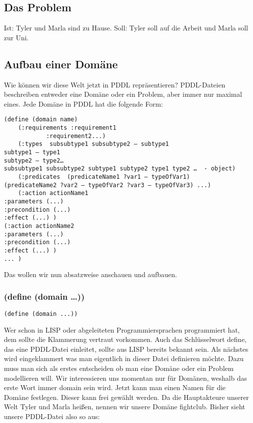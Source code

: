 \documentclass[koma,DIV=1,BCOR=1mm]{article}
\begin{document}
\subsection{Das Problem}
\label{sec-2-2}
Ist: Tyler und Marla sind zu Hause.
Soll: Tyler soll auf die Arbeit und Marla soll zur Uni.
\subsection{Aufbau einer Domäne}
\label{sec-2-3}
Wie können wir diese Welt jetzt in PDDL repräsentieren?
PDDL-Dateien beschreiben entweder eine Domäne oder ein Problem, aber immer nur maximal eines.
Jede Domäne in PDDL hat die folgende Form:

\begin{verbatim}
(define (domain name)
	(:requirements :requirement1
 			:requirement2...)
	(:types  subsubtype1 subsubtype2 – subtype1
subtype1 – type1
subtype2 – type2…
subsubtype1 subsubtype2 subtype1 subtype2 type1 type2 …  - object)
	(:predicates  (predicateName1 ?var1 – typeOfVar1)
(predicateName2 ?var2 – typeOfVar2 ?var3 – typeOfVar3) ...)
	(:action actionName1
:parameters (...)
:precondition (...)
:effect (...) )
(:action actionName2
:parameters (...)
:precondition (...)
:effect (...) )
... )
\end{verbatim}
Das wollen wir nun absatzweise anschauen und aufbauen.

\subsubsection{(define (domain \ldots{}))}
\label{sec-2-3-1}

\begin{verbatim}
(define (domain ...))
\end{verbatim}

Wer schon in LISP oder abgeleiteten Programmiersprachen programmiert
hat, dem sollte die Klammerung vertraut vorkommen. Auch das
Schlüsselwort define, das eine PDDL-Datei einleitet, sollte aus LISP
bereits bekannt sein. Als nächstes wird eingeklammert was man
eigentlich in dieser Datei definieren möchte. Dazu muss man sich als
erstes entscheiden ob man eine Domäne oder ein Problem modellieren
will. Wir interessieren uns momentan nur für Domänen, weshalb das
erste Wort immer domain sein wird. Jetzt kann man einen Namen für die
Domäne festlegen. Dieser kann frei gewählt werden. Da die Hauptakteure
unserer Welt Tyler und Marla heißen, nennen wir unsere Domäne
fightclub. Bisher sieht unsere PDDL-Datei also so aus:
\end{document}
